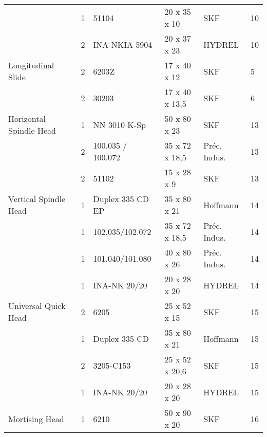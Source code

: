 \begin{tabular}{@{}|l|l|l|l|l|l|@{}}
    & 1              & 51104             & 20 x 35 x 10        & SKF                   & 10                \\
    & 2              & INA-NKIA 5904     & 20 x 37 x 23        & HYDREL                & 10                \\
    \midrule
    Longitudinal Slide         & 2              & 6203Z             & 17 x 40 x 12        & SKF                   & 5                 \\
    & 2              & 30203             & 17 x 40 x 13,5      & SKF                   & 6                 \\
    \midrule
    Horizontal Spindle Head    & 1              & NN 3010 K-Sp      & 50 x 80 x 23        & SKF                   & 13                \\
    & 2              & 100.035 / 100.072 & 35 x 72 x 18,5      & Préc. Indus.          & 13                \\
    & 2              & 51102             & 15 x 28 x 9         & SKF                   & 13                \\
    \midrule
    Vertical Spindle Head      & 1              & Duplex 335 CD EP  & 35 x 80 x 21        & Hoffmann              & 14                \\
    & 1              & 102.035/102.072   & 35 x 72 x 18,5      & Préc. Indus.          & 14                \\
    & 1              & 101.040/101.080   & 40 x 80 x 26        & Préc. Indus.          & 14                \\
    & 1              & INA-NK 20/20      & 20 x 28 x 20        & HYDREL                & 14                \\
    \midrule
    Universal Quick Head       & 2              & 6205              & 25 x 52 x 15        & SKF                   & 15                \\
    & 1              & Duplex 335 CD     & 35 x 80 x 21        & Hoffmann              & 15                \\
    & 2              & 3205-C153         & 25 x 52 x 20,6      & SKF                   & 15                \\
    & 1              & INA-NK 20/20      & 20 x 28 x 20        & HYDREL                & 15                \\
    \midrule
    Mortising Head             & 1              & 6210              & 50 x 90 x 20        & SKF                   & 16                \\

\end{tabular}
